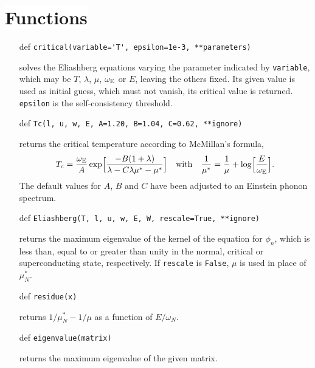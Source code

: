 \documentclass[a4paper]{article}
\def\sub#1{\sb{\mathrm{#1}}}
\def\headline#1{\section*{\normalsize\normalfont%
   \rlap{\rule[0.5ex]{\textwidth}{0.4pt}}\qquad\colorbox{white}{#1}}}
\begin{document}
   \headline{Functions}

   \begin{itemize}
      \item[def] \verb|critical(variable='T', epsilon=1e-3, **parameters)|

      solves the Eliashberg equations varying the parameter indicated by
      \verb|variable|, which may be $T$, $\lambda$, $\mu$, $\omega \sub E$ or
      $E$, leaving the others fixed. Its given value is used as initial guess,
      which must not vanish, its critical value is returned. \verb|epsilon| is
      the self-consistency threshold.

      \item[def] \verb|Tc(l, u, w, E, A=1.20, B=1.04, C=0.62, **ignore)|

      returns the critical temperature according to McMillan's formula,
      \begin{equation*}
         T \sub c = \frac {\omega \sub E} A \exp
         \Bigl[ \frac{-B (1 + \lambda)}{\lambda - C \lambda \mu^* - \mu^*} \Bigr]
         \quad \text{with} \quad
         \frac 1 {\mu^*} =
         \frac 1 \mu + \log \Bigl[ \frac E {\omega \sub E} \Bigr].
      \end{equation*}
      The default values for $A$, $B$ and $C$ have been adjusted to an Einstein
      phonon spectrum.

      \item[def] \verb|Eliashberg(T, l, u, w, E, W, rescale=True, **ignore)|

      returns the maximum eigenvalue of the kernel of the equation for $\phi_n$,
      which is less than, equal to or greater than unity in the normal, critical
      or superconducting state, respectively. If \verb|rescale| is \verb|False|,
      $\mu$ is used in place of $\mu^*_N$.

      \item[def] \verb|residue(x)|

      returns $1 / \mu^*_N - 1 / \mu$ as a function of $E / \omega_N$.

      \item[def] \verb|eigenvalue(matrix)|

      returns the maximum eigenvalue of the given matrix.
   \end{itemize}
\end{document}
